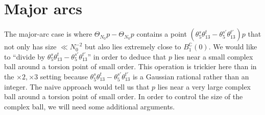 \documentclass[11pt]{amsart}
\theoremstyle{definition}
\newcommand{\C}{{\mathbb C}}
\begin{document}



\section{Major 
arcs}\label{s:supermajor}
The major-arc case is where $\Theta_{N_0}p-\Theta_{N_0}p$ contains a point $(\theta_5^s \theta_{13}^t-\theta_5^{s'}\theta_{13}^{t'})p$ that not only has size $\ll N_0^{-2}$ but also lies extremely close to $B^{\C}_{1}(0)$.  We would like to ``divide by $\theta_5^s \theta_{13}^t-\theta_5^{s'}\theta_{13}^{t'}$'' in order to deduce that $p$ lies near a small complex ball around a torsion point of small order.  This operation is trickier here than in the $\times 2, \times 3$ setting because $\theta_5^s \theta_{13}^t-\theta_5^{s'}\theta_{13}^{t'}$ is a Gaussian rational rather than an integer.  The naive approach would tell us that $p$ lies near a very large complex ball around a torsion point of small order.  In order to control the size of the complex ball, we will need some additional arguments.


\end{document}
